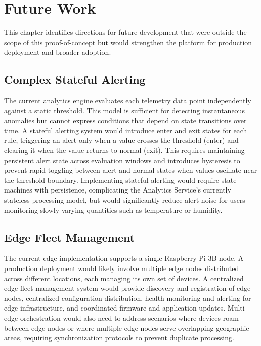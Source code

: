 
%

\chapter{Future Work}
\label{cha:FutureWork}

This chapter identifies directions for future development that were outside the scope of this proof-of-concept but would strengthen the platform for production deployment and broader adoption.

\section{Complex Stateful Alerting}
The current analytics engine evaluates each telemetry data point independently against a static threshold. This model is sufficient for detecting instantaneous anomalies but cannot express conditions that depend on state transitions over time. A stateful alerting system would introduce enter and exit states for each rule, triggering an alert only when a value crosses the threshold (enter) and clearing it when the value returns to normal (exit). This requires maintaining persistent alert state across evaluation windows and introduces hysteresis to prevent rapid toggling between alert and normal states when values oscillate near the threshold boundary. Implementing stateful alerting would require state machines with persistence, complicating the Analytics Service's currently stateless processing model, but would significantly reduce alert noise for users monitoring slowly varying quantities such as temperature or humidity.

\section{Edge Fleet Management}
The current edge implementation supports a single Raspberry Pi 3B node. A production deployment would likely involve multiple edge nodes distributed across different locations, each managing its own set of devices. A centralized edge fleet management system would provide discovery and registration of edge nodes, centralized configuration distribution, health monitoring and alerting for edge infrastructure, and coordinated firmware and application updates. Multi-edge orchestration would also need to address scenarios where devices roam between edge nodes or where multiple edge nodes serve overlapping geographic areas, requiring synchronization protocols to prevent duplicate processing.

